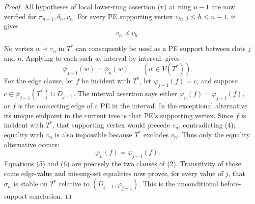 \begin{proof}
All hypotheses of local lower-rung assertion (v) at rung \(n-1\) are now
verified for \(\pi_{n-1},\delta_n,v_n\).  For every PE supporting vertex
\(v_h\), \(j\leq h\leq n-1\), it gives
\[
                              v_n\preceq v_h.                  \tag{4}
\]

No vertex \(w\prec v_n\) in \(T^*\) can consequently be used as a PE
support between slots \(j\) and \(n\).  Applying
 to each such \(w\), interval by
interval, gives
\[
              \overline\varphi_{j-1}(w)=\overline\varphi_n(w)
              \qquad(w\in V(T^*)).                            \tag{5}
\]
For the edge clause, let \(f\) be incident with \(T^*\), let
\(\varphi_{j-1}(f)=c\), and suppose
\(c\in\overline\varphi_{j-1}(T^*)\cup D_{j-1}\).
The interval assertion  says either
\(\varphi_n(f)=\varphi_{j-1}(f)\), or \(f\) is the connecting edge of a PE
in the interval.  In the exceptional alternative its unique endpoint in
the current tree is that PE's supporting vertex.  Since \(f\) is incident
with \(T^*\), that supporting vertex would precede \(v_n\), contradicting
(4); equality with \(v_n\) is also impossible because \(T^*\) excludes
\(v_n\).  Thus only the equality alternative occurs:
\[
                         \varphi_n(f)=\varphi_{j-1}(f).         \tag{6}
\]
Equations (5) and (6) are precisely the two clauses of (2).  Transitivity
of those same edge-value and missing-set equalities now proves, for every
value of \(j\), that
\(\sigma_n\) is stable on \(T^*\) relative to
\((D_{j-1},\varphi_{j-1})\).  This is the unconditional before-support
conclusion.


\end{proof}
